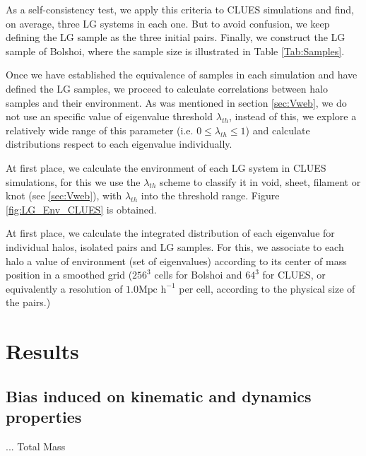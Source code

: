 \documentclass[usenatbib]{latex/mn2e}
\begin{document}
As a self-consistency test, we apply this criteria to CLUES simulations 
and find, on average, three LG systems in each one. But to avoid confusion, 
we keep defining the LG sample as the three initial pairs. Finally, we 
construct the LG sample of Bolshoi, where the sample size is illustrated 
in Table \ref{Tab:Samples}.


Once we have established the equivalence of samples in each simulation and 
have defined the LG samples, we proceed to calculate correlations between 
halo samples and their environment. As was mentioned in section 
\ref{sec:Vweb}, we do not use an specific value of eigenvalue threshold 
$\lambda_{th}$, instead of this, we explore a relatively wide range of 
this parameter (i.e. $0 \leq \lambda_{th} \leq 1$) and calculate 
distributions respect to each eigenvalue individually.


At first place, we calculate the environment of each LG system in CLUES 
simulations, for this we use the $\lambda_{th}$ scheme to classify it in 
void, sheet, filament or knot (see \ref{sec:Vweb}), with $\lambda_{th}$
into the threshold range. Figure \ref{fig:LG_Env_CLUES} is obtained.


At first place, we calculate the integrated distribution of each 
eigenvalue for individual halos, isolated pairs and LG samples. For this, 
we associate to each halo a value of environment (set of eigenvalues)
according to its center of mass position in a smoothed grid ($256^3$ 
cells for Bolshoi and $64^3$ for CLUES, or equivalently a resolution of 
$1.0 \mbox{Mpc h}^{-1} $ per cell, according to the physical size of the 
pairs.)


\section{Results}
\label{sec:Results}

\subsection{Bias induced on kinematic and dynamics properties}
\label{subsec:bias_kinematic}

... Total Mass
\end{document}
